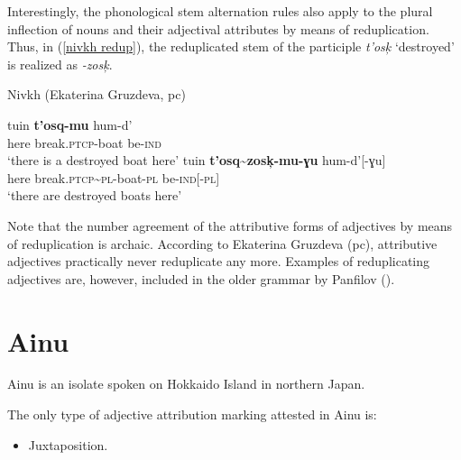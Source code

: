 Interestingly, the phonological stem alternation rules also apply to the plural inflection of nouns and their adjectival attributes by means of reduplication. Thus, in (\ref{nivkh redup}), the reduplicated stem of the participle \textit{t'osk̦} ‘destroyed’ is realized as \textit{-zosk̦}.
\begin{exe}
\ex \label{nivkh redup}
\rm{Nivkh (Ekaterina Gruzdeva, pc)}
\begin{xlist}
\ex 
\gll	tuin \textbf{t'osq-mu} hum-d'\\
	here break.\textsc{ptcp}-boat be-\textsc{ind}\\
\glt	‘there is a destroyed boat here’ 
\ex	\label{nivkh unaltered}
\gll	tuin \textbf{t'osq\textasciitilde zosk̦-mu-ɣu} hum-d'[-ɣu]\\
	here break.\textsc{ptcp}\textasciitilde \textsc{pl}-boat-\textsc{pl} be-\textsc{ind}[-\textsc{pl}]\\
\glt	‘there are destroyed boats here’
\end{xlist}
\end{exe}
Note that the number agreement of the attributive forms of adjectives by means of reduplication is archaic. According to Ekaterina Gruzdeva (pc), attributive adjectives practically never reduplicate any more. Examples of reduplicating adjectives are, however, included in the older grammar by Panfilov (\citeyear{panfilov1965}).

\section{Ainu}
Ainu is an isolate spoken on Hokkaido Island in northern Japan.

The only type of adjective attribution marking attested in Ainu is:
\begin{itemize}
\item Juxtaposition.
\end{itemize}

